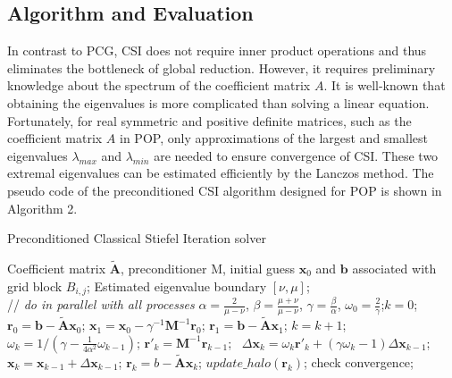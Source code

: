 \documentclass{sig-alternate}
\begin{document}
\subsection{Algorithm and Evaluation}
In contrast to PCG, CSI does not require inner product operations and thus eliminates the bottleneck of global reduction. However, it requires preliminary knowledge about the spectrum of the coefficient matrix $A$. 
It is well-known that obtaining the eigenvalues is more complicated than solving a linear equation. 
Fortunately, for real symmetric and positive definite  matrices, such as the coefficient matrix $A$ in POP,
only approximations of the largest and smallest eigenvalues $\lambda_{max}$ and $\lambda_{min}$ are needed to ensure convergence of CSI. 
These two extremal eigenvalues can be estimated efficiently by the Lanczos method. 
The pseudo code of the preconditioned CSI algorithm designed for POP is shown in Algorithm 2.


\begin{algorithm}[h]
\caption{Preconditioned Classical Stiefel Iteration solver}
\label{alg:pcsi}
\begin{algorithmic}[1]
\REQUIRE Coefficient matrix $\tilde{\textbf{A}}$, preconditioner  M, initial guess  $\textbf{x}_0$ and $\textbf{b}$ associated with grid block $B_{i,j}$; Estimated eigenvalue boundary $[\nu,\mu]$;  \\
 // \qquad    \textit{do in parallel with all processes}
\STATE $\alpha =\frac{2}{\mu -\nu}$, $ \beta = \frac{\mu +\nu}{\mu -\nu}$, $\gamma = \frac{\beta}{\alpha}$, $\omega_0 =\frac{ 2}{\gamma}$;\quad $k = 0$;
\STATE $\textbf{r}_0 = \textbf{b}-\tilde{\textbf{A}}\textbf{x}_0$; $\textbf{x}_1 =\textbf{x}_0 -\gamma^{-1}\textbf{M}^{-1}\textbf{r}_0$; $\textbf{r}_1 =\textbf{b} -\tilde{\textbf{A}}\textbf{x}_1$; 
\STATE $k=k+1$;
\STATE $\omega_k = 1/(\gamma - \frac{1}{4\alpha^2}\omega_{k-1})$; 
\STATE $\textbf{r}'_{k} =\textbf{M}^{-1}\textbf{r}_{k-1}$;  \
\STATE $\Delta \textbf{x}_{k} =\omega_k\textbf{r}'_{k}+(\gamma \omega_k-1)\Delta \textbf{x}_{k-1}$; 
\STATE $\textbf{x}_{k} =\textbf{x}_{k-1}+\Delta \textbf{x}_{k-1}$; 
\STATE $\textbf{r}_{k} =b- \tilde{\textbf{A}}\textbf{x}_{k}$; 
\STATE $update\_halo(\textbf{r}_k)$; \COMMENT{boundary communication}
\IF { $k \%  n_{c} == 0$ }
\STATE check convergence;
\ENDIF
\ENDWHILE
\end{algorithmic}
\end{algorithm}
\end{document}
